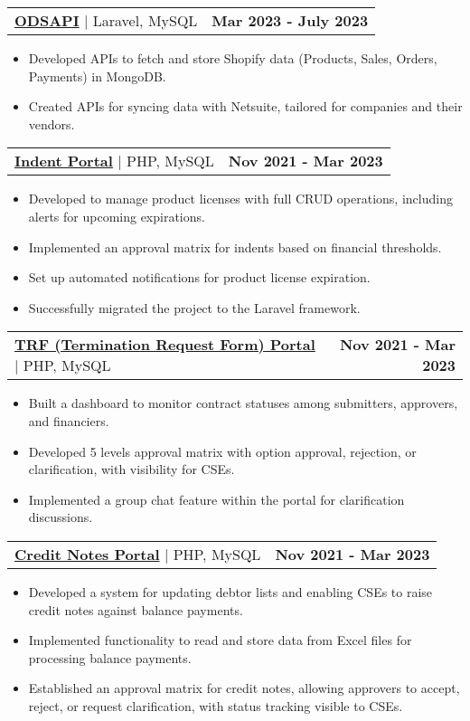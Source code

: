 \documentclass[letterpaper,11pt]{article}
\makeatletter
\newcommand{\resumeItem}[1]{
  \item\small{
    {#1 \vspace{-2pt}}
  }
}
\newcommand{\resumeProjectHeading}[2]{
    \item
    \begin{tabular*}{1.001\textwidth}{l@{\extracolsep{\fill}}r}
      \small#1 & \textbf{\small #2}\\
    \end{tabular*}\vspace{-7pt}
}
\newcommand{\resumeItemListStart}{\begin{itemize}}
\newcommand{\resumeItemListEnd}{\end{itemize}\vspace{-5pt}}
\makeatother
\begin{document}
      \resumeProjectHeading
          {{\textbf{\large{\underline{ODSAPI}}} {\raisebox{-0.1\height}\faExternalLink }} $|$ \large{Laravel, MySQL}}{Mar 2023 - July 2023}
          \resumeItemListStart
            \resumeItem{\normalsize{Developed APIs to fetch and store Shopify data (Products, Sales, Orders, Payments) in MongoDB.}}
            \resumeItem{\normalsize{Created APIs for syncing data with Netsuite, tailored for companies and their vendors.}}
          \resumeItemListEnd
          \vspace{-13pt}

      \resumeProjectHeading
          {{\textbf{\large{\underline{Indent Portal}}} {\raisebox{-0.1\height}\faExternalLink }} $|$ \large{PHP, MySQL}}{Nov 2021 - Mar 2023}
          \resumeItemListStart
            \resumeItem{\normalsize{Developed to manage product licenses with full CRUD operations, including alerts for upcoming expirations.}}
            \resumeItem{\normalsize{Implemented an approval matrix for indents based on financial thresholds.}}
            \resumeItem{\normalsize{Set up automated notifications for product license expiration.}}
            \resumeItem{\normalsize{Successfully migrated the project to the Laravel framework.}}
          \resumeItemListEnd
          \vspace{-13pt}
      
      \resumeProjectHeading
          {{\textbf{\large{\underline{TRF (Termination Request Form) Portal}}} {\raisebox{-0.1\height}\faExternalLink }} $|$ \large{PHP, MySQL}}{Nov 2021 - Mar 2023}
          \resumeItemListStart
            \resumeItem{\normalsize{Built a dashboard to monitor contract statuses among submitters, approvers, and financiers.}}
            \resumeItem{\normalsize{Developed 5 levels approval matrix with option approval, rejection, or clarification, with visibility for CSEs.}}
            \resumeItem{\normalsize{Implemented a group chat feature within the portal for clarification discussions.}}
          \resumeItemListEnd
          \vspace{-13pt}

      \resumeProjectHeading
          {{\textbf{\large{\underline{Credit Notes Portal}}} {\raisebox{-0.1\height}\faExternalLink }} $|$ \large{PHP, MySQL}}{Nov 2021 - Mar 2023}
          \resumeItemListStart
            \resumeItem{\normalsize{Developed a system for updating debtor lists and enabling CSEs to raise credit notes against balance payments.}}
            \resumeItem{\normalsize{Implemented functionality to read and store data from Excel files for processing balance payments.}}
            \resumeItem{\normalsize{Established an approval matrix for credit notes, allowing approvers to accept, reject, or request clarification, with status tracking visible to CSEs.}}
          \resumeItemListEnd
          \vspace{-13pt}
\end{document}
